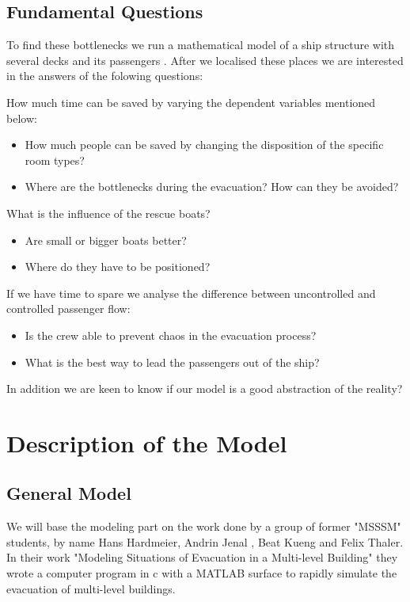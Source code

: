 \documentclass[11pt]{article}
\begin{document}
\subsection{Fundamental Questions}
To find these bottlenecks we run a mathematical model of a ship structure  with several decks and its passengers \cite{shipdecks}. After we localised these places we are interested in the answers of the folowing questions:

\bigskip
How much time can be saved by varying the dependent variables mentioned below:
\begin{itemize}
\item How much people can be saved by changing the disposition of the specific room types?
\item Where are the bottlenecks during the evacuation? How can they be avoided?
\end{itemize}

What is the influence of the rescue boats?
\begin{itemize}
\item Are small or bigger boats better?
\item Where do they have to be positioned?
\end{itemize}

If we have time to spare we analyse the difference between uncontrolled and controlled passenger flow:
\begin{itemize}
\item Is the crew able to prevent chaos in the evacuation process?
\item What is the best way to lead the passengers out of the ship?
\end{itemize}

In addition we are keen to know if our model is a good abstraction of the reality?

\section{Description of the Model}
\subsection{General Model}

We will base the modeling part on the work done by a group of former "MSSSM" students, by name Hans Hardmeier, Andrin Jenal , Beat Kueng and Felix Thaler. \cite{Building} In their work "Modeling Situations of Evacuation in a Multi-level Building" they wrote a computer program in c with a MATLAB surface to rapidly simulate the evacuation of multi-level buildings.\bigskip
\end{document}
